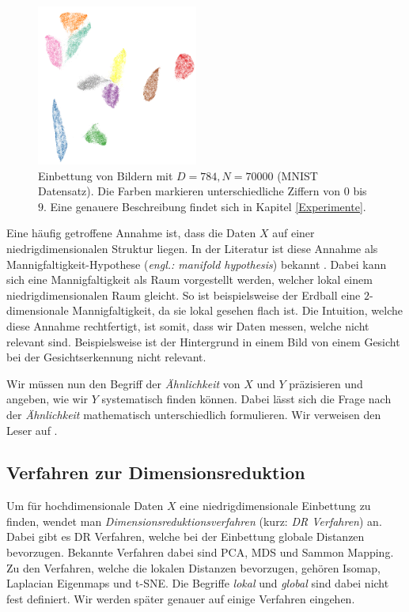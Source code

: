 	\begin{figure}
		\centering
		\includegraphics[width=200px, height=200px]{Figures/umap_mnist}
		\caption[UMAP auf MNIST]{Einbettung von Bildern mit $D = 784, N=\num{70000}$ (MNIST Datensatz). Die Farben markieren unterschiedliche 
								Ziffern von $0$ bis $9$. Eine genauere Beschreibung findet sich in Kapitel \ref{Experimente}.}
		\label{fig:umap_mnist}
	\end{figure}

	Eine häufig getroffene Annahme ist, dass die Daten $X$ auf einer niedrigdimensionalen 
	Struktur liegen. In der Literatur ist diese Annahme als Mannigfaltigkeit-Hypothese 
	(\textit{engl.: manifold hypothesis}) bekannt \cite{Mitter,Rifai}. Dabei kann sich eine 
	Mannigfaltigkeit als Raum vorgestellt werden, welcher lokal einem niedrigdimensionalen Raum gleicht. 
	So ist beispielsweise der Erdball eine $2$-dimensionale Mannigfaltigkeit, da sie lokal gesehen 
	flach ist. Die Intuition, welche diese Annahme rechtfertigt, ist somit, dass wir Daten messen, 
	welche nicht relevant sind. Beispielsweise ist der Hintergrund in einem Bild von einem Gesicht 
	bei der Gesichtserkennung nicht relevant. 

	Wir müssen nun den Begriff der \textit{Ähnlichkeit} von $X$ und $Y$ präzisieren und angeben, 
	wie wir $Y$ systematisch finden können. 
	Dabei lässt sich die Frage nach der \textit{Ähnlichkeit} mathematisch unterschiedlich formulieren. 
	Wir verweisen den Leser auf \cite{Lee2009,Rieck2015}. 

\subsection*{Verfahren zur Dimensionsreduktion}
	Um für hochdimensionale Daten $X$ eine niedrigdimensionale Einbettung zu finden, wendet 
	man \textit{Dimensionsreduktionsverfahren} (kurz: \textit{DR Verfahren}) an. 
	Dabei gibt es DR Verfahren, welche bei der Einbettung globale Distanzen bevorzugen. 
	Bekannte Verfahren dabei sind PCA, MDS und Sammon Mapping. Zu den Verfahren, welche 
	die lokalen Distanzen bevorzugen, gehören Isomap, Laplacian Eigenmaps und t-SNE. 
	Die Begriffe \textit{lokal} und \textit{global} sind dabei nicht fest definiert. 
	Wir werden später genauer auf einige Verfahren eingehen. 

